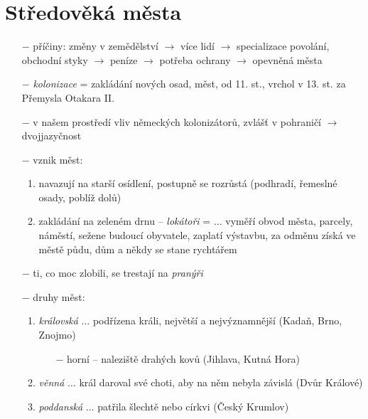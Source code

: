 \documentclass{article}
\begin{document}
\section*{Středověká města}
\begin{itemize}
    \vspace{-0.5em}
    \setlength\itemsep{0.15em}
    \item[$-$] příčiny: změny v zemědělství $\rightarrow$ více lidí $\rightarrow$ specializace povolání, obchodní styky $\rightarrow$ peníze $\rightarrow$ potřeba ochrany $\rightarrow$ opevněná města
    \item[$-$] \textit{kolonizace} = zakládání nových osad, měst, od 11. st., vrchol v 13. st. za Přemysla Otakara II.
    \item[$-$] v našem prostředí vliv německých kolonizátorů, zvlášť v pohraničí $\rightarrow$ dvojjazyčnost
    \item[$-$] vznik měst:
    \begin{enumerate}
        \vspace{-0.5em}
        \setlength\itemsep{0.15em}
        \item navazují na starší osídlení, postupně se rozrůstá (podhradí, řemeslné osady, poblíž dolů)
        \item zakládání na zeleném drnu -- \textit{lokátoři} =  $\dots$ vyměří obvod města, parcely, náměstí, sežene budoucí obyvatele, zaplatí výstavbu, za odměnu získá ve městě půdu, dům a někdy se stane rychtářem
    \end{enumerate}
    \item[$-$] ti, co moc zlobili, se trestají na \textit{pranýři}
    \item[$-$] druhy měst:
    \begin{enumerate}
        \vspace{-0.5em}
        \setlength\itemsep{0.15em}
        \item \textit{královská} $\dots$ podřízena králi, největší a nejvýznamnější (Kadaň, Brno, Znojmo)
        \begin{itemize}
            \vspace{-0.5em}
            \setlength\itemsep{0.15em}
            \item[$-$] horní -- naleziště drahých kovů (Jihlava, Kutná Hora)
        \end{itemize}
        \item \textit{věnná} $\dots$ král daroval své choti, aby na něm nebyla závislá (Dvůr Králové)
        \item \textit{poddanská} $\dots$ patřila šlechtě nebo církvi (Český Krumlov)

\end{enumerate}
\end{itemize}
\end{document}
